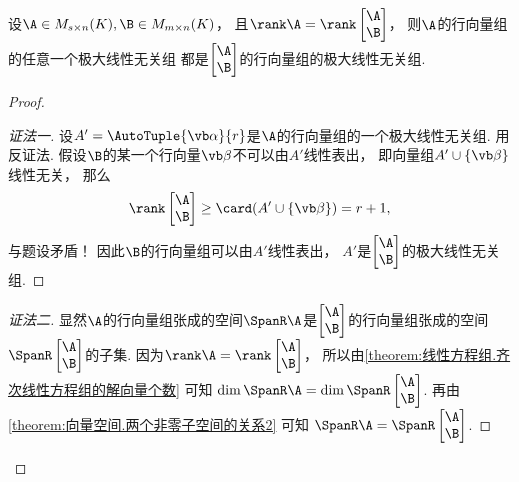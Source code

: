 \begin{example}\label{example:向量空间.等秩矩阵的行向量组的等价性}
设\(\A \in M_{s \times n}(K),
\B \in M_{m \times n}(K)\)，
且\(\rank\A
= \rank\begin{bmatrix}
	\A \\ \B
\end{bmatrix}\)，
则\(\A\)的行向量组的任意一个极大线性无关组
都是\(\begin{bmatrix}
	\A \\ \B
\end{bmatrix}\)的行向量组的极大线性无关组.
\begin{proof}
\begin{proof}[证法一]
设\(A' = \AutoTuple{\vb\alpha}{r}\)是\(\A\)的行向量组的一个极大线性无关组.
用反证法.
假设\(\B\)的某一个行向量\(\vb\beta\)不可以由\(A'\)线性表出，
即向量组\(A' \cup \{\vb\beta\}\)线性无关，
那么\begin{equation*}
	\rank\begin{bmatrix}
		\A \\ \B
	\end{bmatrix}
	\geq \card(A' \cup \{\vb\beta\})
	= r + 1,
\end{equation*}
与题设矛盾！
因此\(\B\)的行向量组可以由\(A'\)线性表出，
\(A'\)是\(\begin{bmatrix}
	\A \\ \B
\end{bmatrix}\)的极大线性无关组.
\end{proof}
\begin{proof}[证法二]
显然\(\A\)的行向量组张成的空间\(\SpanR\A\)是\(\begin{bmatrix}
	\A \\ \B
\end{bmatrix}\)的行向量组张成的空间\(\SpanR\begin{bmatrix}
	\A \\ \B
\end{bmatrix}\)的子集.
因为\(\rank\A
= \rank\begin{bmatrix}
	\A \\ \B
\end{bmatrix}\)，
所以由\cref{theorem:线性方程组.齐次线性方程组的解向量个数} 可知
\(\dim\SpanR\A
= \dim\SpanR\begin{bmatrix}
	\A \\ \B
\end{bmatrix}\).
再由\cref{theorem:向量空间.两个非零子空间的关系2} 可知
\(\SpanR\A = \SpanR\begin{bmatrix}
	\A \\ \B
\end{bmatrix}\).
\end{proof}\let\qed\relax
\end{proof}
\end{example}

